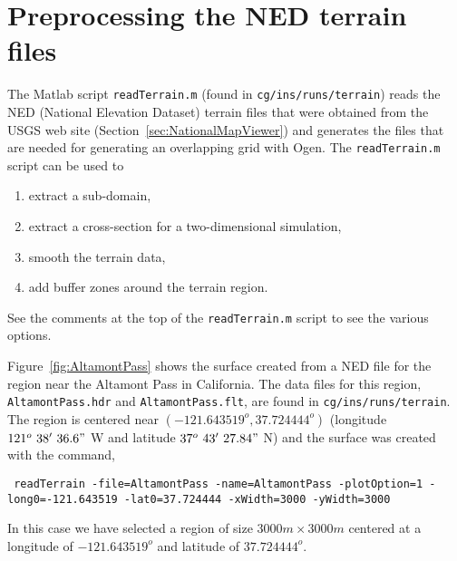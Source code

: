 \documentclass[11pt]{article}
\begin{document}
\section{Preprocessing the NED terrain files}  \label{sec:readTerrain}

The Matlab script {\tt readTerrain.m} (found in {\tt cg/ins/runs/terrain})
reads the NED (National Elevation Dataset) terrain files that were obtained from the USGS web site (Section~\ref{sec:NationalMapViewer})
and generates the files that are needed for generating an overlapping grid with Ogen. The {\tt readTerrain.m}
script can be used to
\begin{enumerate}
  \item extract a sub-domain, 
  \item extract a cross-section for a two-dimensional simulation,
  \item smooth the terrain data,
  \item add buffer zones around the terrain region.
\end{enumerate}
See the comments at the top of the {\tt readTerrain.m} script to see the various options.

Figure~\ref{fig:AltamontPass} shows the surface created from a NED file for the region near
the Altamont Pass in California. The data files for this region, {\tt AltamontPass.hdr} and
{\tt AltamontPass.flt}, are found in {\tt cg/ins/runs/terrain}. The region is centered near $(-121.643519^o,37.724444^o)$ 
 (longitude $121^o~38'~36.6"$ W and latitude $37^o~43'~27.84"$ N) and the surface
was created with the command, 
\begin{flushleft}\tt
  readTerrain -file=AltamontPass -name=AltamontPass -plotOption=1 -long0=-121.643519 -lat0=37.724444 -xWidth=3000 -yWidth=3000
\end{flushleft}
In this case we have selected a region of size $3000m\times 3000m$ centered at a longitude of $-121.643519^o$ and 
latitude of $37.724444^o$. 
\end{document}
